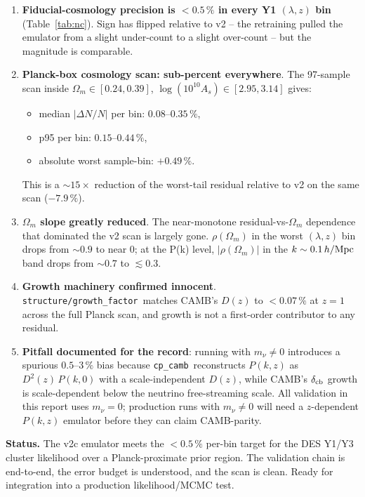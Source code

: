 \documentclass[11pt]{article}
\newcommand{\cp}{\texttt{cp\_camb}}
\newcommand{\gfmod}{\texttt{structure/growth\_factor}}
\begin{document}
\begin{enumerate}
  \item \textbf{Fiducial-cosmology precision is $<0.5\,\%$ in every
    Y1 $(\lambda, z)$ bin} (Table~\ref{tab:nc}). Sign has flipped
    relative to v2 -- the retraining pulled the emulator from a
    slight under-count to a slight over-count -- but the magnitude
    is comparable.
  \item \textbf{Planck-box cosmology scan: sub-percent everywhere}.
    The 97-sample scan inside $\Omega_m\in[0.24, 0.39]$,
    $\log(10^{10}A_s)\in[2.95, 3.14]$ gives:
    \begin{itemize}
      \item median $|\Delta N/N|$ per bin: $0.08$--$0.35\,\%$,
      \item p95 per bin: $0.15$--$0.44\,\%$,
      \item absolute worst sample-bin: $+0.49\,\%$.
    \end{itemize}
    This is a $\sim\!15\times$ reduction of the worst-tail residual
    relative to v2 on the same scan ($-7.9\,\%$).
  \item \textbf{$\Omega_m$ slope greatly reduced}. The near-monotone
    residual-vs-$\Omega_m$ dependence that dominated the v2 scan is
    largely gone. $\rho(\Omega_m)$ in the worst $(\lambda, z)$ bin
    drops from $\sim\!0.9$ to near 0; at the P(k) level,
    $|\rho(\Omega_m)|$ in the $k\sim 0.1\,h/{\rm Mpc}$ band drops
    from $\sim\!0.7$ to $\lesssim 0.3$.
  \item \textbf{Growth machinery confirmed innocent}. \gfmod\ matches
    CAMB's $D(z)$ to $<0.07\,\%$ at $z=1$ across the full Planck
    scan, and growth is not a first-order contributor to any
    residual.
  \item \textbf{Pitfall documented for the record}: running with
    $m_\nu \neq 0$ introduces a spurious $0.5$--$3\,\%$ bias because
    \cp\ reconstructs $P(k,z)$ as $D^2(z)\,P(k,0)$ with a
    scale-independent $D(z)$, while CAMB's $\delta_{\rm cb}$ growth
    is scale-dependent below the neutrino free-streaming scale.
    All validation in this report uses $m_\nu = 0$; production
    runs with $m_\nu \neq 0$ will need a $z$-dependent $P(k,z)$
    emulator before they can claim CAMB-parity.
\end{enumerate}

\noindent\textbf{Status.} The v2c emulator meets the $<0.5\,\%$
per-bin target for the DES Y1/Y3 cluster likelihood over a
Planck-proximate prior region. The validation chain is
end-to-end, the error budget is understood, and the scan is clean.
Ready for integration into a production likelihood/MCMC test.
\end{document}
